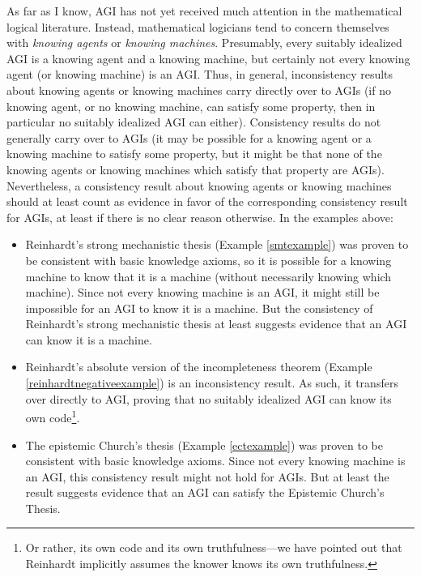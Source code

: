 \documentclass[runningheads]{llncs}
\begin{document}
\begin{remark}
  As far as I know, AGI has not yet received much attention in the mathematical logical
  literature. Instead, mathematical logicians tend to concern themselves with
  \emph{knowing agents} or \emph{knowing machines}. Presumably, every
  suitably idealized AGI is a
  knowing agent and a knowing machine, but certainly not every
  knowing agent (or knowing machine) is an AGI. Thus, in general,
  inconsistency results about knowing agents or knowing machines
  carry directly over to AGIs (if no knowing agent, or no knowing machine, can
  satisfy some property, then in particular no suitably idealized AGI can either).
  Consistency results do not generally carry over to AGIs (it may be possible for
  a knowing agent or a knowing machine to satisfy some property, but it might be
  that none of the knowing agents or knowing machines which satisfy that property
  are AGIs). Nevertheless, a consistency result about knowing agents or knowing machines
  should at least count as evidence in favor of the corresponding consistency result
  for AGIs, at least if there is no clear reason otherwise. In the examples above:
  \begin{itemize}
    \item
    Reinhardt's strong mechanistic thesis (Example \ref{smtexample})
    was proven to be consistent with basic knowledge axioms, so it is possible
    for a knowing machine to
    know that it is a machine (without necessarily knowing which machine).
    Since not every knowing machine is an AGI, it might still be impossible
    for an AGI to know it is a machine. But the consistency of Reinhardt's
    strong mechanistic thesis at least suggests evidence that an AGI can
    know it is a machine.
    \item
    Reinhardt's absolute version of the incompleteness theorem
    (Example \ref{reinhardtnegativeexample}) is an inconsistency result.
    As such, it transfers over directly to AGI, proving that no suitably idealized
    AGI can know its own code\footnote{Or rather,
    its own code and its
    own truthfulness---we have pointed out \cite{alexander2014machine} that
    Reinhardt implicitly
    assumes the knower knows its own truthfulness.}.
    \item
    The epistemic Church's thesis (Example \ref{ectexample}) was proven to be
    consistent with basic knowledge axioms.
    Since not every knowing
    machine is an AGI, this consistency result might not hold for AGIs.
    But at least the result suggests evidence that
    an AGI can satisfy the Epistemic Church's Thesis.
  \end{itemize}
\end{remark}
\end{document}
